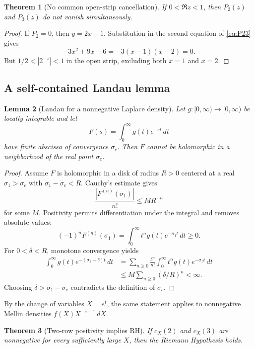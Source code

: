 \documentclass[11pt]{article}
\newtheorem{theorem}{Theorem}[section]
\newtheorem{lemma}[theorem]{Lemma}
\newcommand{\1}{\mathbf 1}
\newcommand{\dd}{\,d}
\begin{document}
\begin{theorem}[No common open-strip cancellation]
If $0<\Re z<1$, then $P_2(z)$ and $P_3(z)$ do not vanish simultaneously.
\end{theorem}

\begin{proof}
If $P_2=0$, then $y=2x-1$.  Substitution in the second equation of
\eqref{eq:P23} gives
\[
 -3x^2+9x-6=-3(x-1)(x-2)=0.
\]
But $1/2<|2^{-z}|<1$ in the open strip, excluding both $x=1$ and $x=2$.
\end{proof}

\subsection{A self-contained Landau lemma}

\begin{lemma}[Landau for a nonnegative Laplace density]
\label{lem:landau}
Let $g:[0,\infty)\to[0,\infty)$ be locally integrable and let
\[
 F(s)=\int_0^\infty g(t)e^{-st}\dd t
\]
have finite abscissa of convergence $\sigma_c$.  Then $F$ cannot be holomorphic
in a neighborhood of the real point $\sigma_c$.
\end{lemma}

\begin{proof}
Assume $F$ is holomorphic in a disk of radius $R>0$ centered at a real
$\sigma_1>\sigma_c$ with $\sigma_1-\sigma_c<R$.  Cauchy's estimate gives
\[
 \frac{|F^{(n)}(\sigma_1)|}{n!}\le MR^{-n}
\]
for some $M$.  Positivity permits differentiation under the integral and removes
absolute values:
\[
 (-1)^nF^{(n)}(\sigma_1)
 =\int_0^\infty t^ng(t)e^{-\sigma_1t}\dd t\ge0.
\]
For $0<\delta<R$, monotone convergence yields
\begin{align*}
\int_0^\infty g(t)e^{-(\sigma_1-\delta)t}\dd t
&=\sum_{n\ge0}\frac{\delta^n}{n!}
\int_0^\infty t^ng(t)e^{-\sigma_1t}\dd t\\
&\le M\sum_{n\ge0}(\delta/R)^n<\infty.
\end{align*}
Choosing $\delta>\sigma_1-\sigma_c$ contradicts the definition of
$\sigma_c$.
\end{proof}

By the change of variables $X=e^t$, the same statement applies to nonnegative
Mellin densities $f(X)X^{-s-1}\dd X$.

\begin{theorem}[Two-row positivity implies RH]
\label{thm:TRP-RH}
If $c_X(2)$ and $c_X(3)$ are nonnegative for every sufficiently large $X$, then
the Riemann Hypothesis holds.
\end{theorem}
\end{document}
